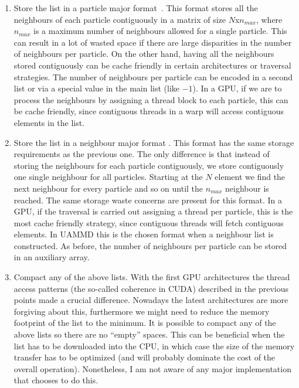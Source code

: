 \documentclass[twoside,openright,titlepage,numbers=noenddot,%
headinclude,footinclude,cleardoublepage=empty,abstract=on,
BCOR=5mm,fontsize=11pt, dvipsnames, paper=b5
]{scrreprt}
\newcommand{\uammd}{\gls{UAMMD}\xspace}
\newcommand{\gpu}{\gls{GPU}\xspace}
\begin{document}
\begin{enumerate}
\item Store the list in a particle major format~\cite{Anderson2008}\cite{Plimpton1995}.
  This format stores all the neighbours of each particle contiguously in a matrix of size $N$x$n_{max}$, where $n_{max}$ is a maximum number of neighbours allowed for a single particle. This can result in a lot of wasted space if there are large disparities in the number of neighbours per particle. On the other hand, having all the neighbours stored contiguously can be cache friendly in certain architectures or traversal strategies. The number of neighbours per particle can be encoded in a second list or via a special value in the main list (like $-1$). In a \gpu, if we are to process the neighbours by assigning a thread block to each particle, this can be cache friendly, since contiguous threads in a warp will access contiguous elements in the list.
\item Store the list in a neighbour major format \cite{Berendsen1995}.
  This format has the same storage requirements as the previous one. The only difference is that instead of storing the neighbours for each particle contiguously, we store contiguously one single neighbour for all particles. Starting at the $N$ element we find the next neighbour for every particle and so on until the $n_{max}$ neighbour is reached. The same storage waste concerns are present for this format. In a \gpu, if the traversal is carried out assigning a thread per particle, this is the most cache friendly strategy, since contiguous threads will fetch contiguous elements. In \uammd this is the chosen format when a neighbour list is constructed. 
  As before, the number of neighbours per particle can be stored in an auxiliary array.
\item Compact any of the above lists.%
  With the first \gpu architectures the thread access patterns (the so-called coherence in CUDA) described in the previous points made a crucial difference. Nowadays the latest architectures are more forgiving about this, furthermore we might need to reduce the memory footprint of the list to the minimum. It is possible to compact any of the above lists so there are no ``empty'' spaces. This can be beneficial when the list has to be downloaded into the CPU, in which case the size of the memory transfer has to be optimized (and will probably dominate the cost of the overall operation). Nonetheless, I am not aware of any major implementation that chooses to do this.
\end{enumerate}
\end{document}
